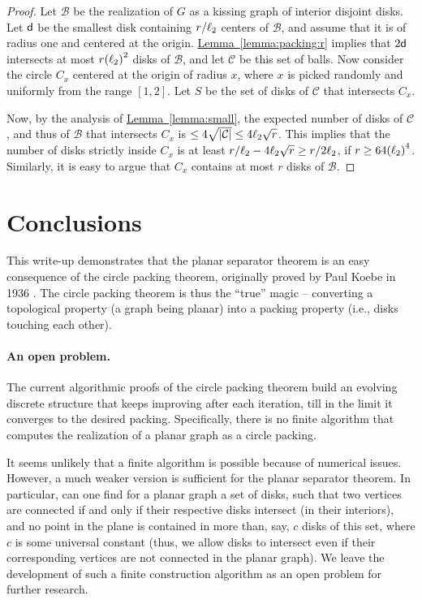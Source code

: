 \documentclass[12pt]{article}
\theoremstyle{remark}\theoremheaderfont{\sf}\theorembodyfont{\upshape}\newtheorem{defn}[theorem]{Definition}
\newcommand{\HLink}[2]{\hyperref[#2]{#1~\ref*{#2}}}
\newcommand{\lemref}[1]{\HLink{Lemma}{lemma:#1}}
\newcommand{\BallSet}{\mathcal{B}}\newcommand{\BallSetA}{\mathcal{C}}
\newcommand{\SepSet}{S}
\newcommand{\Graph}{{G}}
\newcommand{\pth}[1]{\mleft({#1}\mright)}
\newcommand{\cardin}[1]{\left| {#1} \right|}\newcommand{\norm}[1]{\left\| {#1} \right\|}
\begin{document}
\begin{proof}
    Let $\BallSet$ be the realization of $\Graph$ as a kissing graph
    of interior disjoint disks.  Let $\mathsf{d}$ be the smallest disk
    containing $r/\ell_2$ centers of $\BallSet$, and assume that
    it is of radius one and centered at the origin.
    \lemref{packing:r} implies that $2\mathsf{d}$ intersects at most
    $r\pth{\constDblTwo}^2$ disks of $\BallSet$, and let $\BallSetA$
    be this set of balls. Now consider the circle $C_x$ centered at
    the origin of radius $x$, where $x$ is picked randomly and
    uniformly from the range $[1,2]$. Let $\SepSet$ be the set of
    disks of $\BallSetA$ that intersects $C_x$. 

    Now, by the analysis of \lemref{small}, the expected number of
    disks of $\BallSetA$, and thus of $\BallSet$ that intersects $C_x$
    is
    $\leq 4 \sqrt{ \cardin{\BallSetA}} \leq 4
    \constDblTwo\sqrt{r}$.
    This implies that the number of disks strictly inside $C_x$ is at
    least
    $r/\ell_2 - 4 \ell_2\sqrt{r} \geq r/2\ell_2$, if
    $r \geq 64 \pth{\constDblTwo}^4$. Similarly, it is easy to argue
    that $C_x$ contains at most $r$ disks of $\BallSet$.
\end{proof}


\section{Conclusions}

This write-up demonstrates that the planar separator theorem is an
easy consequence of the circle packing theorem, originally proved by
Paul Koebe in 1936 \cite{k-kdka-36}.  The circle packing theorem is
thus the ``true'' magic -- converting a topological property (a graph
being planar) into a packing property (i.e., disks touching each
other).

\paragraph{An open problem.}

The current algorithmic proofs of the circle packing theorem build an
evolving discrete structure that keeps improving after each iteration,
till in the limit it converges to the desired packing.  Specifically,
there is no finite algorithm that computes the realization of a planar
graph as a circle packing.

It seems unlikely that a finite algorithm is possible because of
numerical issues. However, a much weaker version is sufficient for the
planar separator theorem. In particular, can one find for a planar
graph a set of disks, such that two vertices are connected if and only
if their respective disks intersect (in their interiors), and no point
in the plane is contained in more than, say, $c$ disks of this set,
where $c$ is some universal constant (thus, we allow disks to
intersect even if their corresponding vertices are not connected in
the planar graph). We leave the development of such a finite
construction algorithm as an open problem for further research.
\end{document}
